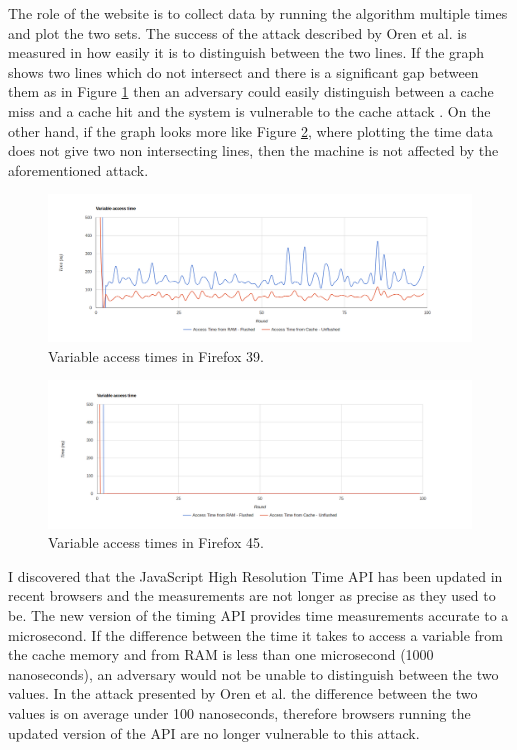 \documentclass[10pt,a4paper,twoside]{book}
\begin{document}
The role of the website is to collect data by running the algorithm multiple times and plot the two sets. The success of the attack described by Oren et al. \cite{oren2015spy} is measured in how easily it is to distinguish between the two lines. If the graph shows two lines which do not intersect and there is a significant gap between them as in Figure \ref{firefox39} then an adversary could easily distinguish between a cache miss and a cache hit and the system is vulnerable to the cache attack \cite{oren2015spy}. On the other hand, if the graph looks more like Figure \ref{firefox45}, where plotting the time data does not give two non intersecting lines, then the machine is not affected by the aforementioned attack.

\begin{figure}[h]
\centering
\includegraphics[width=\textwidth]{figures/firefox39.png}
\caption{Variable access times in Firefox 39.}
\label{firefox39}
\end{figure}

\begin{figure}[h]
\centering
\includegraphics[width=\textwidth]{figures/firefox45.png}
\caption{Variable access times in Firefox 45.}
\label{firefox45}
\end{figure}

I discovered that the JavaScript High Resolution Time API has been updated in recent browsers and the measurements are not longer as precise as they used to be. The new version of the timing API provides time measurements accurate to a microsecond. If the difference between the time it takes to access a variable from the cache memory and from RAM is less than one microsecond (1000 nanoseconds), an adversary would not be unable to distinguish between the two values. In the attack presented by Oren et al. the difference between the two values is on average under 100 nanoseconds, therefore browsers running the updated version of the API are no longer vulnerable to this attack. 
\end{document}
